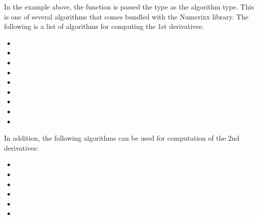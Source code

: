 \documentclass[letterpaper,10pt,english]{sphinxmanual}
\begin{document}
\sphinxAtStartPar
In the example above, the  function is passed the  type as the algorithm type. This is one of several algorithms that comes bundled with the Numerixx library. The following is a list of algorithms for computing the 1st derivatives:
\begin{itemize}
\item {} 
\sphinxAtStartPar
{}

\item {} 
\sphinxAtStartPar
{}

\item {} 
\sphinxAtStartPar
{}

\item {} 
\sphinxAtStartPar
{}

\item {} 
\sphinxAtStartPar
{}

\item {} 
\sphinxAtStartPar
{}

\item {} 
\sphinxAtStartPar
{}

\item {} 
\sphinxAtStartPar
{}

\item {} 
\sphinxAtStartPar
{}

\end{itemize}

\sphinxAtStartPar
In addition, the following algorithms can be used for computation of the 2nd derivatives:
\begin{itemize}
\item {} 
\sphinxAtStartPar
{}

\item {} 
\sphinxAtStartPar
{}

\item {} 
\sphinxAtStartPar
{}

\item {} 
\sphinxAtStartPar
{}

\item {} 
\sphinxAtStartPar
{}

\item {} 
\sphinxAtStartPar
{}

\end{itemize}
\end{document}
